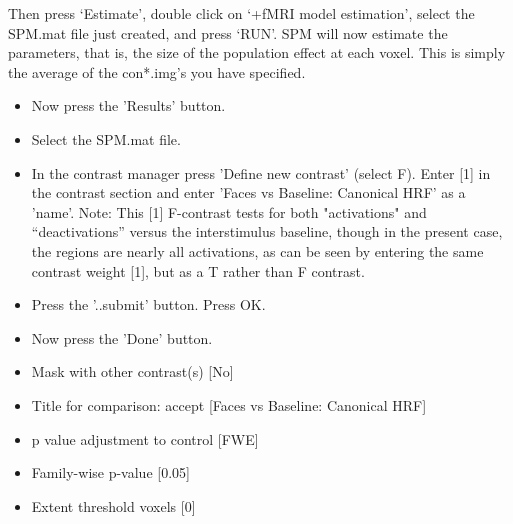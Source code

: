 \documentclass[a4paper,titlepage]{book}
\newcommand{\bi}{\begin{itemize}}
\newcommand{\ei}{\end{itemize}}
\begin{document}
Then press `Estimate', double click on `+fMRI model estimation', select the SPM.mat file just created, and press `RUN'.
SPM will now estimate the parameters, that is, the size of the population effect at each voxel. This is simply the average of the con*.img's you have specified.

\bi
\item{Now press the 'Results' button.}
\item{Select the SPM.mat file.}
\item{In the contrast manager press 'Define new contrast' (select F). Enter [1] in the contrast section and enter 'Faces vs Baseline: Canonical HRF' as a 'name'. Note: This [1] F-contrast tests for both "activations" and ``deactivations'' versus the interstimulus baseline, though in the present case, the regions are nearly all activations, as can be seen by entering the same contrast weight [1], but as a T rather than F contrast.}
\item{Press the '..submit' button. Press OK.}
\item{Now press the 'Done' button.}
\item{Mask with other contrast(s) [No]}
\item{Title for comparison: accept [Faces vs Baseline: Canonical HRF]}
\item{p value adjustment to control [FWE]}
\item{Family-wise p-value [0.05]}
\item{Extent threshold {voxels} [0]}
\ei
\end{document}
